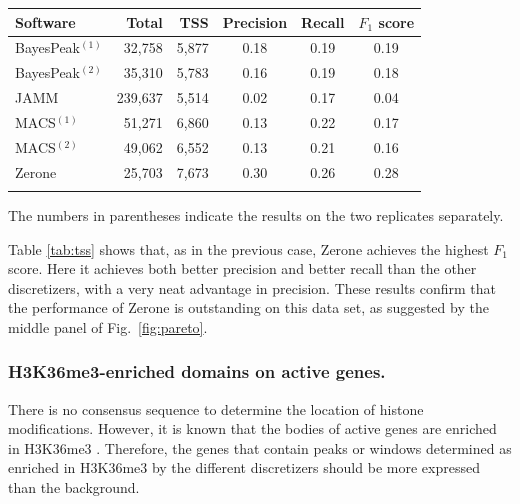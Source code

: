 \documentclass{bioinfo}
\begin{document}
\begin{table}[!t]
{\begin{tabular}{lrrccc}
        \toprule
        \textbf{Software}  & \textbf{Total}  & \textbf{TSS} &
        \textbf{Precision} & \textbf{Recall} & \textbf{$F_{1}$ score} \\
        \midrule
        BayesPeak$^{(1)}$ &  32,758 & 5,877 & 0.18 & 0.19 & 0.19 \\
        BayesPeak$^{(2)}$ &  35,310 & 5,783 & 0.16 & 0.19 & 0.18 \\
        JAMM              & 239,637 & 5,514 & 0.02 & 0.17 & 0.04 \\
        MACS$^{(1)}$      &  51,271 & 6,860 & 0.13 & 0.22 & 0.17 \\
        MACS$^{(2)}$      &  49,062 & 6,552 & 0.13 & 0.21 & 0.16 \\
        Zerone            &  25,703 & 7,673 & 0.30 & 0.26 & 0.28 \\
        \botrule
\end{tabular}}{The numbers in parentheses indicate the results on the two
replicates separately.}
\end{table}

Table \ref{tab:tss} shows that, as in the previous case, Zerone
achieves the highest $F_1$ score. Here it achieves both better
precision and better recall than the other discretizers, with a
very neat advantage in precision. These results confirm that
the performance of Zerone is outstanding on this data set, as suggested
by the middle panel of Fig.~\ref{fig:pareto}.

\subsubsection{H3K36me3-enriched domains on active genes.}
There is no consensus sequence to determine the location of histone
modifications. However, it is known that the bodies of active genes
are enriched in H3K36me3 \citep{pmid16122420,pmid23739122}. Therefore,
the genes that contain peaks or windows determined as enriched in
H3K36me3 by the different discretizers should be more expressed than
the background.
\end{document}
